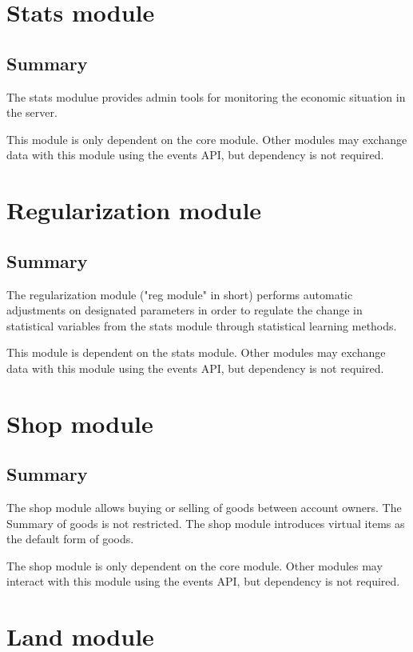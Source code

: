 \documentclass{report}
\begin{document}
	\part{Stats module}
		\chapter{Summary}

			The stats modulue provides admin tools for monitoring the economic situation in the server.

			This module is only dependent on the core module.
			Other modules may exchange data with this module using the events API,
			but dependency is not required.

	\part{Regularization module}
		\chapter{Summary}

			The regularization module ("reg module" in short) performs automatic adjustments on designated parameters
			in order to regulate the change in statistical variables from the stats module through statistical learning methods.

			This module is dependent on the stats module.
			Other modules may exchange data with this module using the events API,
			but dependency is not required.

	\part{Shop module}
		\chapter{Summary}

			The shop module allows buying or selling of goods between account owners.
			The Summary of goods is not restricted.
			The shop module introduces virtual items as the default form of goods.

			The shop module is only dependent on the core module.
			Other modules may interact with this module using the events API,
			but dependency is not required.

	\part{Land module}
\end{document}
